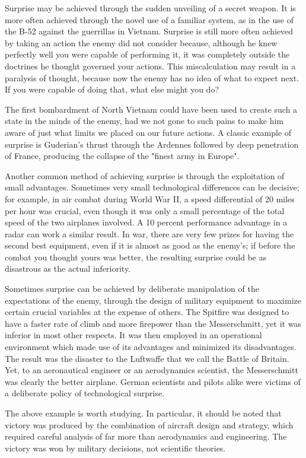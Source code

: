 Surprise may be achieved through the sudden unveiling of a secret weapon. It is more often achieved through the novel use of a familiar system, as in the use of the B-52 against the guerrillas in Vietnam. Surprise is still more often achieved by taking an action the enemy did not consider because, although he knew perfectly well you were capable of performing it, it was completely outside the doctrines he thought governed your actions. This miscalculation may result in a paralysis of thought, because now the enemy has no idea of what to expect next. If you were capable of doing that, what else might you do?

The first bombardment of North Vietnam could have been used to create such a state in the minds of the enemy, had we not gone to such pains to make him aware of just what limits we placed on our future actions. A classic example of surprise is Guderian's thrust through the Ardennes followed by deep penetration of France, producing the collapse of the "finest army in Europe".

Another common method of achieving surprise is through the exploitation of small advantages. Sometimes very small technological differences can be decisive; for example, in air combat during World War II, a speed differential of 20 miles per hour was crucial, even though it was only a small percentage of the total speed of the two airplanes involved. A 10 percent performance advantage in a radar can work a similar result. In war, there are very few prizes for having the second best equipment, even if it is almost as good as the enemy's; if before the combat you thought yours was better, the resulting surprise could be as disastrous as the actual inferiority.

Sometimes surprise can be achieved by deliberate manipulation of the expectations of the enemy, through the design of military equipment to maximize certain crucial variables at the expense of others. The Spitfire was designed to have a faster rate of climb and more firepower than the Messerschmitt, yet it was inferior in most other respects. It was then employed in an operational environment which made use of its advantages and minimized its disadvantages. The result was the disaster to the Luftwaffe that we call the Battle of Britain. Yet, to an aeronautical engineer or an aerodynamics scientist, the Messerschmitt was clearly the better airplane. German scientists and pilots alike were victims of a deliberate policy of technological surprise.

The above example is worth studying. In particular, it should be noted that victory was produced by the combination of aircraft design and strategy, which required careful analysis of far more than aerodynamics and engineering. The victory was won by military decisions, not scientific theories.

